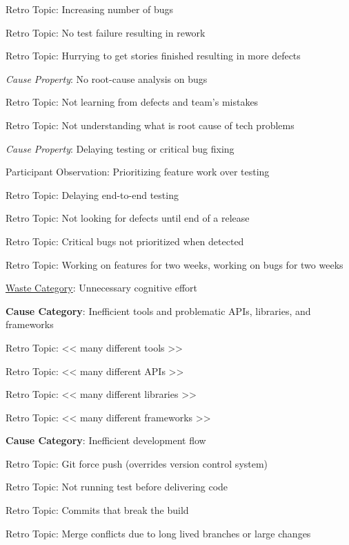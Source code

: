\quad \quad \quad Retro Topic: Increasing number of bugs

\quad \quad \quad Retro Topic: No test failure resulting in rework

\quad \quad \quad Retro Topic: Hurrying to get stories finished resulting in more defects

\quad \quad \textit{Cause Property}: No root-cause analysis on bugs

\quad \quad \quad Retro Topic: Not learning from defects and team's mistakes

\quad \quad \quad Retro Topic: Not understanding what is root cause of tech problems

\quad \quad \textit{Cause Property}: Delaying testing or critical bug fixing

\quad \quad \quad Participant Observation: Prioritizing feature work over testing

\quad \quad \quad Retro Topic: Delaying end-to-end testing

\quad \quad \quad Retro Topic: Not looking for defects until end of a release

\quad \quad \quad Retro Topic: Critical bugs not prioritized when detected

\quad \quad \quad Retro Topic: Working on features for two weeks, working on bugs for two weeks




\underline{Waste Category}: Unnecessary cognitive effort

\quad \textbf{Cause Category}: Inefficient tools and problematic APIs, libraries, and frameworks

\quad \quad Retro Topic: << many different tools >>

\quad \quad Retro Topic: << many different APIs >>

\quad \quad Retro Topic: << many different libraries >>

\quad \quad Retro Topic: << many different frameworks >>

\quad \textbf{Cause Category}: Inefficient development flow

\quad \quad Retro Topic: Git force push (overrides version control system)

\quad \quad Retro Topic: Not running test before delivering code

\quad \quad Retro Topic: Commits that break the build

\quad \quad Retro Topic: Merge conflicts due to long lived branches or large changes


